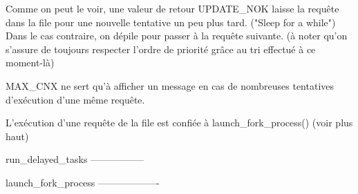 Comme on peut le voir, une valeur de retour UPDATE_NOK laisse la requête dans la file pour une nouvelle tentative un peu
plus tard. ("Sleep for a while") Dans le cas contraire, on dépile pour passer à la requête suivante. (à noter qu'on
s'assure de toujours respecter l'ordre de priorité grâce au tri effectué à ce moment-là)

MAX_CNX ne sert qu'à afficher un message en cas de nombreuses tentatives d'exécution d'une même requête.

L'exécution d'une requête de la file est confiée à launch_fork_process() (voir plus haut)

run_delayed_tasks
-----------------

launch_fork_process
-------------------
